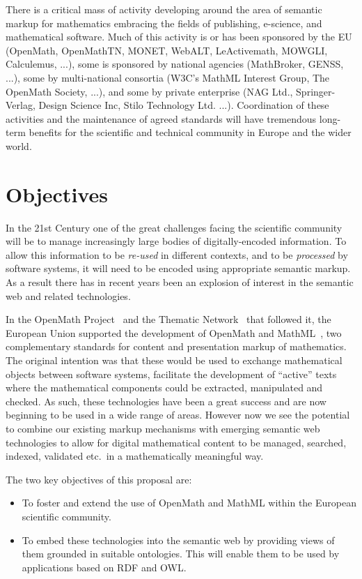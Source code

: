 \documentclass{euproposal}
\begin{document}
There is a critical mass of activity developing around the area of
semantic markup for mathematics embracing the fields of publishing,
e-science, and mathematical software.  Much of this activity is or has
been sponsored by the EU (OpenMath, OpenMathTN, MONET, WebALT,
LeActivemath, MOWGLI, Calculemus, ...), some is sponsored by national
agencies (MathBroker, GENSS, ...), some by multi-national consortia
(W3C's MathML Interest Group, The OpenMath Society, ...), and some by
private enterprise (NAG Ltd., Springer-Verlag, Design Science Inc,
Stilo Technology Ltd. ...).  Coordination of these activities and the
maintenance of agreed standards will have tremendous long-term
benefits for the scientific and technical community in Europe and the
wider world.




\chapter{Objectives}\label{cha:object}

In the 21st Century one of the great challenges facing the scientific
community will be to manage increasingly large bodies of
digitally-encoded information.  To allow this information to be
\emph{re-used} in different contexts, and to be \emph{processed} by
software systems,
it will need to be encoded using appropriate semantic markup.  As a
result there has in recent years been an explosion of interest in the
semantic web and related technologies.

In the OpenMath Project~\cite{OM-EU} and the Thematic
Network~\cite{OM-TN} that followed it, the European Union supported
the development of OpenMath and MathML~\cite{}, two complementary standards
for content and presentation markup of mathematics.  The original
intention was that these would be used to exchange mathematical
objects between software systems, facilitate the development of
``active'' texts where the mathematical components could be extracted,
manipulated and checked.  As such, these technologies have been a
great success and are now beginning to be used in a wide range of
areas.  However now we see the potential to combine our existing
markup mechanisms with emerging semantic web technologies to allow for
digital mathematical content to be managed, searched, indexed,
validated etc.~in a mathematically meaningful way.

The two key objectives of this proposal are:
\begin{itemize}
\item To foster and extend the use of OpenMath and MathML within the
  European scientific community.
\item To embed these technologies into the semantic web by providing
  views of them grounded in suitable ontologies.  This will enable
  them to be used by applications based on RDF and OWL.
\end{itemize}
\end{document}
